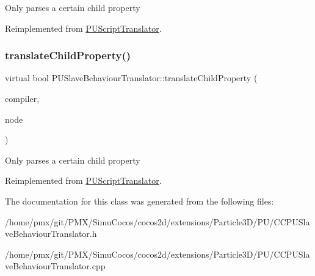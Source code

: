 Only parses a certain child property 

Reimplemented from \hyperlink{classPUScriptTranslator_a0374d83a8a04e57918975d525e0f8fe8}{P\+U\+Script\+Translator}.

\mbox{\label{classPUSlaveBehaviourTranslator_a93db28f5b7a89dbed470f0ac6cdce82b}} 
\subsubsection{\texorpdfstring{translate\+Child\+Property()}{translateChildProperty()}\hspace{0.1cm}{\footnotesize\ttfamily [2/2]}}
{\footnotesize\ttfamily virtual bool P\+U\+Slave\+Behaviour\+Translator\+::translate\+Child\+Property (\begin{DoxyParamCaption}\item[{\hyperlink{classPUScriptCompiler}{P\+U\+Script\+Compiler} $\ast$}]{compiler,  }\item[{\hyperlink{classPUAbstractNode}{P\+U\+Abstract\+Node} $\ast$}]{node }\end{DoxyParamCaption})\hspace{0.3cm}{\ttfamily [virtual]}}

Only parses a certain child property 

Reimplemented from \hyperlink{classPUScriptTranslator_a0374d83a8a04e57918975d525e0f8fe8}{P\+U\+Script\+Translator}.



The documentation for this class was generated from the following files\+:\begin{DoxyCompactItemize}
\item 
/home/pmx/git/\+P\+M\+X/\+Simu\+Cocos/cocos2d/extensions/\+Particle3\+D/\+P\+U/C\+C\+P\+U\+Slave\+Behaviour\+Translator.\+h\item 
/home/pmx/git/\+P\+M\+X/\+Simu\+Cocos/cocos2d/extensions/\+Particle3\+D/\+P\+U/C\+C\+P\+U\+Slave\+Behaviour\+Translator.\+cpp\end{DoxyCompactItemize}
